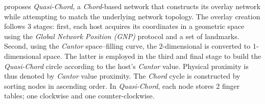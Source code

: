 \cite{SZ2008} proposes \emph{Quasi-Chord}, a \emph{Chord}-based network that
constructs its overlay network while attempting to match the underlying 
network topology.
The overlay creation follows $3$ stages:
first, each host acquires its coordinates in
a geometric space using the \emph{Global Network Position (GNP)} protocol
\cite{ng_gnp_2001} and a set of landmarks.
Second, using the \emph{Cantor} space--filling curve, 
the $2$-dimensional is converted to $1$-dimensional space. 
The latter is employed in the third and final stage to build 
the \emph{Quasi-Chord} circle according to the host's \emph{Cantor} value. 
Physical proximity is thus denoted by \emph{Cantor} value proximity. 
The \emph{Chord} cycle is constructed by sorting nodes in 
ascending order. In \emph{Quasi-Chord},
each node stores $2$ finger tables; one clockwise and one counter-clockwise.
%
%
%
